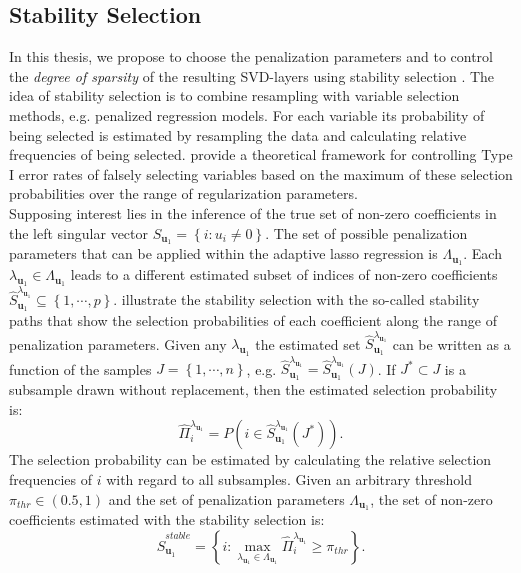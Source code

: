 \subsection{Stability Selection}
In this thesis, we propose to choose the penalization parameters and to control the \textit{degree of sparsity} of the resulting SVD-layers using stability selection \cite{Meinshausen2010}. The idea of stability selection is to combine resampling with variable selection methods, e.g. penalized regression models. For each variable its probability of being selected is estimated by resampling the data and calculating relative frequencies of being selected. \citet{Meinshausen2010} provide a theoretical framework for controlling Type I error rates of falsely selecting variables based on the maximum of these selection probabilities over the range of regularization parameters. \\
Supposing interest lies in the inference of the true set of non-zero coefficients in the left singular vector $S_{\mathbf{u}_{1}}=\left\{i:u_{i} \neq 0 \right\}$. The set of possible penalization parameters that can be applied within the adaptive lasso regression is $\Lambda_{\mathbf{u}_{1}}$. Each $\lambda_{\mathbf{u}_{1}} \in \Lambda_{\mathbf{u}_{1}}$ leads to a different estimated subset of indices of non-zero coefficients $\hat{S}^{\lambda_{\mathbf{u}_{1}}}_{\mathbf{u}_{1}}\subseteq\left\{1,\cdots,p\right\}$. 
\citet{Meinshausen2010} illustrate the stability selection with the so-called stability paths that show the 
selection probabilities of each coefficient along the range of penalization parameters. Given any $\lambda_{\mathbf{u}_{1}}$ the estimated set $\hat{S}^{\lambda_{\mathbf{u}_{1}}}_{\mathbf{u}_{1}}$ can be written as a function of the samples $J=\left\{1,\cdots,n \right\} $, e.g. $\hat{S}^{\lambda_{\mathbf{u}_{1}}}_{\mathbf{u}_{1}}=\hat{S}^{\lambda_{\mathbf{u}_{1}}}_{\mathbf{u}_{1}}(J)$. If $J^{*} \subset J$ is a subsample drawn without replacement, then the estimated selection probability is:
\begin{equation}
 \hat{\Pi}_{i}^{\lambda_{\mathbf{u}_{1}}}=P(i \in \hat{S}^{\lambda_{\mathbf{u}_{1}}}_{\mathbf{u}_{1}}(J^{*})).
\end{equation}
The selection probability can be estimated by calculating the relative selection frequencies of $i$ with regard to all subsamples.
Given an arbitrary threshold $\pi_{thr} \in (0.5,1)$ and the set of penalization parameters $\Lambda_{\mathbf{u}_{1}}$, the set of non-zero coefficients estimated with the stability selection is:
\begin{equation} 
 \hat{S}_{\mathbf{u}_{1}}^{stable}=\left\{i: \max_{\lambda_{\mathbf{u}_{1}} \in \Lambda_{\mathbf{u}_{1}}}\hat{\Pi}_{i}^{\lambda_{\mathbf{u}_{1}}} \geq \pi_{thr} \right\}.
\end{equation}
